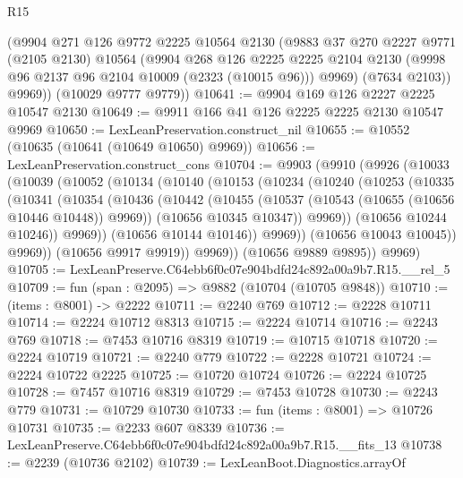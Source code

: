 \begin{lexlean}{R15}
\begin{coremodule}
        (@9904
          @271
          @126
          @9772
          @2225
          @10564
          @2130
          (@9883
            @37
            @270
            @2227
            @9771
            (@2105 @2130)
            @10564
            (@9904
              @268
              @126
              @2225
              @2225
              @2104
              @2130
              (@9998 @96 @2137 @96 @2104 @10009 (@2323 (@10015 @96)))
              @9969)
            (@7634 @2103))
          @9969))
      (@10029 @9777 @9779))
@10641 := @9904 @169 @126 @2227 @2225 @10547 @2130
@10649 := @9911 @166 @41 @126 @2225 @2225 @2130 @10547 @9969
@10650 := LexLeanPreservation.construct_nil
@10655 := @10552 (@10635 (@10641 (@10649 @10650) @9969))
@10656 := LexLeanPreservation.construct_cons
@10704 := @9903
    (@9910
      (@9926
        (@10033
          (@10039
            (@10052
              (@10134
                (@10140
                  (@10153
                    (@10234
                      (@10240
                        (@10253
                          (@10335
                            (@10341
                              (@10354
                                (@10436
                                  (@10442
                                    (@10455
                                      (@10537 (@10543 (@10655 (@10656 @10446 @10448)) @9969))
                                      (@10656 @10345 @10347))
                                    @9969))
                                (@10656 @10244 @10246))
                              @9969))
                          (@10656 @10144 @10146))
                        @9969))
                    (@10656 @10043 @10045))
                  @9969))
              (@10656 @9917 @9919))
            @9969))
        (@10656 @9889 @9895))
      @9969)
@10705 := LexLeanPreserve.C64ebb6f0c07e904bdfd24c892a00a9b7.R15.__rel_5
@10709 := fun (span : @2095) => @9882 (@10704 (@10705 @9848))
@10710 := (items : @8001) -> @2222
@10711 := @2240 @769
@10712 := @2228 @10711
@10714 := @2224 @10712 @8313
@10715 := @2224 @10714
@10716 := @2243 @769
@10718 := @7453 @10716 @8319
@10719 := @10715 @10718
@10720 := @2224 @10719
@10721 := @2240 @779
@10722 := @2228 @10721
@10724 := @2224 @10722 @2225
@10725 := @10720 @10724
@10726 := @2224 @10725
@10728 := @7457 @10716 @8319
@10729 := @7453 @10728
@10730 := @2243 @779
@10731 := @10729 @10730
@10733 := fun (items : @8001) => @10726 @10731
@10735 := @2233 @607 @8339
@10736 := LexLeanPreserve.C64ebb6f0c07e904bdfd24c892a00a9b7.R15.__fits_13
@10738 := @2239 (@10736 @2102)
@10739 := LexLeanBoot.Diagnostics.arrayOf

\end{coremodule}
\end{lexlean}
